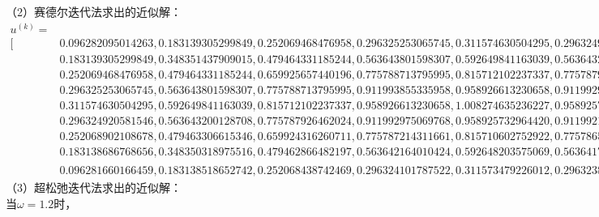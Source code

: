 \documentclass[10pt,a4paper]{article}
\begin{document}
\normalsize
（2）赛德尔迭代法求出的近似解：
\tiny
\begin{align*}
u^{(k)}=&\\
[&0.096282095014263,0.183139305299849,0.252069468476958,0.296325253065745,0.311574630504295,0.296324920581546,0.252068902108678,0.183138686768656,0.096281660166459,\\
&0.183139305299849,0.348351437909015,0.479464331185244,0.563643801598307,0.592649841163039,0.563643200128708,0.479463306615346,0.348350318975516,0.183138518652742,\\
&0.252069468476958,0.479464331185244,0.659925657440196,0.775788713795995,0.815712102237337,0.775787926462024,0.659924316260711,0.479462866482196,0.252068438742469,\\
&0.296325253065745,0.563643801598307,0.775788713795995,0.911993855335958,0.958926613230658,0.911992975069768,0.775787214311661,0.563642164010424,0.296324101787522,\\
&0.311574630504295,0.592649841163039,0.815712102237337,0.958926613230658,1.008274635236227,0.958925732964420,0.815710602752922,0.592648203575069,0.311573479226012,\\
&0.296324920581546,0.563643200128708,0.775787926462024,0.911992975069768,0.958925732964420,0.911992178861438,0.775786570165566,0.563641718916405,0.296323879240509,\\
&0.252068902108678,0.479463306615346,0.659924316260711,0.775787214311661,0.815710602752922,0.775786570165566,0.659923218993784,0.479462108289375,0.252068059646051,\\
&0.183138686768656,0.348350318975516,0.479462866482197,0.563642164010424,0.592648203575069,0.563641718916405,0.479462108289375,0.348349490952611,0.183138104641281,\\
&0.096281660166459,0.183138518652742,0.252068438742469,0.296324101787522,0.311573479226012,0.296323879240509,0.252068059646050,0.183138104641281,0.096281369102766]^T
\end{align*}
\normalsize
（3）超松弛迭代法求出的近似解：\\
当$\omega=1.2$时，
\tiny
\end{document}
